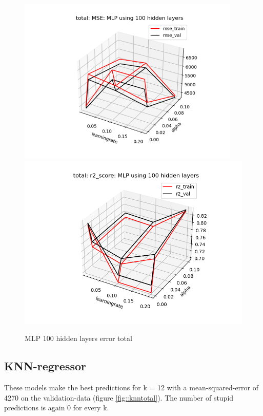 \documentclass[12pt,a4paper]{scrartcl}		%
\begin{document}
\begin{figure}[h]
    \centering
    \includegraphics[scale = 1]{total_mlp_mse_100.png}
    \includegraphics[scale = 1]{total_mlp_r2_100.png}
    \caption{MLP 100 hidden layers error total}
    \label{fig::mlptotal100}
\end{figure}

\subsection{KNN-regressor}
These models make the best predictions for k = 12 with a mean-squared-error of 4270 on the validation-data (figure \ref{fig::knntotal}). 
The number of stupid predictions is again 0 for every k. 
\end{document}
